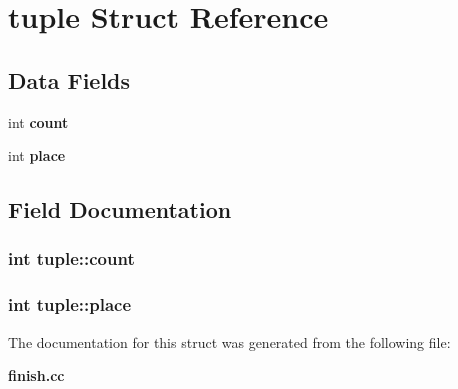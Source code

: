 \section{tuple Struct Reference}
\label{structtuple}
\subsection*{Data Fields}
\begin{CompactItemize}
\item 
int {\bf count}
\item 
int {\bf place}
\end{CompactItemize}


\subsection{Field Documentation}
\subsubsection{\setlength{\rightskip}{0pt plus 5cm}int {\bf tuple::count}}\label{structtuple_o0}


\subsubsection{\setlength{\rightskip}{0pt plus 5cm}int {\bf tuple::place}}\label{structtuple_o1}




The documentation for this struct was generated from the following file:\begin{CompactItemize}
\item 
{\bf finish.cc}\end{CompactItemize}
